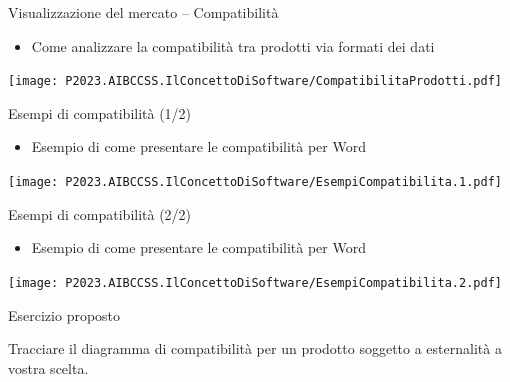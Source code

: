 \documentclass{beamer}
\begin{document}
\begin{frame}
{\centerline{Visualizzazione del mercato -- Compatibilit\`{a}}}
\begin{itemize}
    \item Come analizzare la compatibilit\`{a} tra prodotti via formati dei dati
\end{itemize} 
\begin{center}
    \texttt{[image: P2023.AIBCCSS.IlConcettoDiSoftware/CompatibilitaProdotti.pdf]}
\end{center}

\end{frame}
\begin{frame}
{\centerline{Esempi di compatibilit\`{a} (1/2)}}
\begin{itemize}
    \item Esempio di come presentare le compatibilit\`{a} per Word
\end{itemize} 
\begin{center}
    \texttt{[image: P2023.AIBCCSS.IlConcettoDiSoftware/EsempiCompatibilita.1.pdf]}
\end{center}

\end{frame}

\begin{frame}
{\centerline{Esempi di compatibilit\`{a} (2/2)}}
\begin{itemize}
    \item Esempio di come presentare le compatibilit\`{a} per Word
\end{itemize} 
\begin{center}
    \texttt{[image: P2023.AIBCCSS.IlConcettoDiSoftware/EsempiCompatibilita.2.pdf]}
\end{center}

\end{frame}

\begin{frame}
{\centerline{Esercizio proposto}}
\vspace{1cm}
\begin{center}
    \LARGE{Tracciare il diagramma di compatibilit\`{a} per un prodotto soggetto a esternalit\`{a} a vostra scelta.}
\end{center}

\end{frame}
\end{document}
